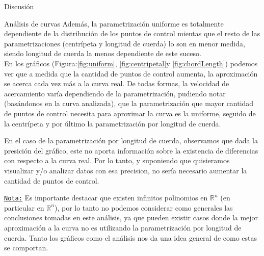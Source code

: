 \begin{section}{Discusión}
\begin{subsection}{Análisis de curvas}
	Además, la parametrización uniforme es totalmente dependiente de la distribución de los puntos de control mientas que el resto de las parametrizaciones (centrípeta y longitud de cuerda) lo son en menor medida, siendo longitud de cuerda la menos dependiente de este suceso.\\
	
	En los gráficos (Figura:\ref{fig:uniform}, \ref{fig:centripetal}y \ref{fig:chordLength}) podemos ver que a medida que la cantidad de puntos de control aumenta, la aproximación se acerca cada vez más a la curva real. De todas formas, la velocidad de acercamiento varía dependiendo de la parametrización, pudiendo notar (basándonos en la curva analizada), que la parametrización que mayor cantidad de puntos de control necesita para aproximar la curva es la uniforme, seguido de la centrípeta y por último la parametrización por longitud de cuerda.
	
	En el caso de la parametrización por longitud de cuerda, observamos que dada la presición del gráfico, este no aporta información sobre la existencia de diferencias con respecto a la curva real. Por lo tanto, y suponiendo que quisieramos visualizar y/o analizar datos con esa precision, no sería necesario aumentar la cantidad de puntos de control.
	
	\underline{\texttt{Nota:}} Es importante destacar que existen infinitos polinomios en $\mathbb{R}^n$ (en particular en $\mathbb{R}^n$), por lo tanto no podemos considerar como generales las conclusiones tomadas en este análisis, ya que pueden existir casos donde la mejor aproximación a la curva no es utilizando la parametrización por longitud de cuerda. Tanto los gráficos como el análisis nos da una idea general de como estas se comportan.
\end{subsection}


	
\end{section}
